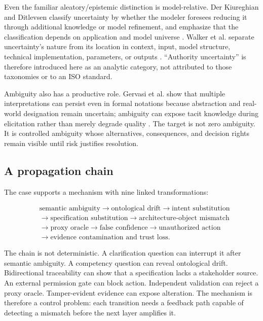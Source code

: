 \documentclass[10pt,a4paper]{article}
\begin{document}
Even the familiar aleatory/epistemic distinction is model-relative. Der Kiureghian and Ditlevsen classify uncertainty by whether the modeler foresees reducing it through additional knowledge or model refinement, and emphasize that the classification depends on application and model universe \cite{derkiureghian2009}. Walker et al. separate uncertainty's nature from its location in context, input, model structure, technical implementation, parameters, or outputs \cite{walker2003}. ``Authority uncertainty'' is therefore introduced here as an analytic category, not attributed to those taxonomies or to an ISO standard.

Ambiguity also has a productive role. Gervasi et al. show that multiple interpretations can persist even in formal notations because abstraction and real-world designation remain uncertain; ambiguity can expose tacit knowledge during elicitation rather than merely degrade quality \cite{gervasi2019}. The target is not zero ambiguity. It is controlled ambiguity whose alternatives, consequences, and decision rights remain visible until risk justifies resolution.

\subsection{A propagation chain}

The case supports a mechanism with nine linked transformations:

\begin{equation}
\begin{split}
&\text{semantic ambiguity} \rightarrow \text{ontological drift}
\rightarrow \text{intent substitution} \\
&\rightarrow \text{specification substitution}
\rightarrow \text{architecture-object mismatch} \\
&\rightarrow \text{proxy oracle} \rightarrow \text{false confidence}
\rightarrow \text{unauthorized action} \\
&\rightarrow \text{evidence contamination and trust loss}.
\end{split}
\end{equation}

The chain is not deterministic. A clarification question can interrupt it after semantic ambiguity. A competency question can reveal ontological drift. Bidirectional traceability can show that a specification lacks a stakeholder source. An external permission gate can block action. Independent validation can reject a proxy oracle. Tamper-evident evidence can expose alteration. The mechanism is therefore a control problem: each transition needs a feedback path capable of detecting a mismatch before the next layer amplifies it.
\end{document}
